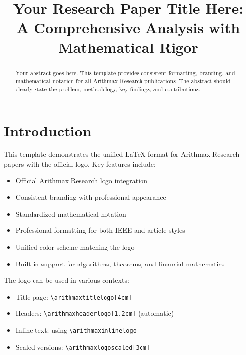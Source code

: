 \documentclass[twocolumn,ieee]{arithmaxresearch}
\begin{document}
\title{Your Research Paper Title Here: \\
A Comprehensive Analysis with Mathematical Rigor}


\maketitle

\begin{center}
\vspace{-1em}
\arithmaxtitlelogo[4cm]
\vspace{0.5em}
\end{center}

\begin{abstract}
Your abstract goes here. This template provides consistent formatting, branding, and mathematical notation for all Arithmax Research publications. The abstract should clearly state the problem, methodology, key findings, and contributions.
\end{abstract}

\section{Introduction}

This template demonstrates the unified LaTeX format for Arithmax Research papers with the official logo. Key features include:

\begin{itemize}
    \item Official Arithmax Research logo integration
    \item Consistent branding with professional appearance
    \item Standardized mathematical notation
    \item Professional formatting for both IEEE and article styles
    \item Unified color scheme matching the logo
    \item Built-in support for algorithms, theorems, and financial mathematics
\end{itemize}

The logo can be used in various contexts:
\begin{itemize}
    \item Title page: \texttt{\textbackslash arithmaxtitlelogo[4cm]}
    \item Headers: \texttt{\textbackslash arithmaxheaderlogo[1.2cm]} (automatic)
    \item Inline text: \arithmaxinlinelogo[0.6cm] using \texttt{\textbackslash arithmaxinlinelogo}
    \item Scaled versions: \texttt{\textbackslash arithmaxlogoscaled[3cm]}
\end{itemize}
\end{document}
